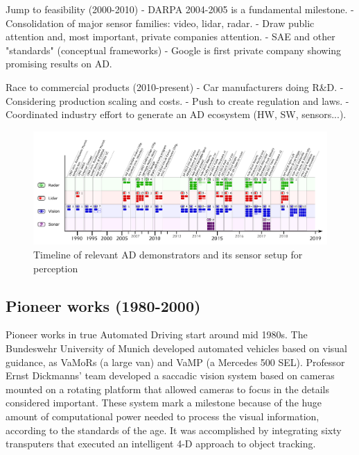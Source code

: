 Jump to feasibility (2000-2010)
  - DARPA 2004-2005 is a fundamental milestone.
  - Consolidation of major sensor families: video, lidar, radar.
  - Draw public attention and, most important, private companies attention.
  - SAE and other "standards" (conceptual frameworks)
  - Google is first private company showing promising results on AD.

Race to commercial products (2010-present)
  - Car manufacturers doing R\&D.
  - Considering production scaling and costs.
  - Push to create regulation and laws.
  - Coordinated industry effort to generate an AD ecosystem (HW, SW, 
  sensors...).
  
  
  
\begin{figure}[p] %
  \centering
  \includegraphics[width=0.95\textheight,angle=90,keepaspectratio]{"img/AD_Timeline_2"}
  \caption{Timeline of relevant AD demonstrators and its sensor setup for 
      perception}
  \label{fig:tech-demos}
\end{figure}

\subsection{Pioneer works (1980-2000)}

Pioneer works in true Automated Driving start around mid 1980s. The
Bundeswehr University of Munich developed automated vehicles based on visual 
guidance, as VaMoRs \cite{Dickmanns1987} (a large van) and VaMP 
\cite{Gregor2002} (a Mercedes 500 SEL). Professor Ernst Dickmanns' team 
developed a saccadic vision system based on cameras mounted on a rotating 
platform that allowed cameras to focus in the details considered important.
These system mark a milestone because of the huge amount of computational power 
needed to process the visual information, according to the standards of the 
age. It was accomplished by integrating sixty transputers that executed an
intelligent 4-D approach to object tracking.

